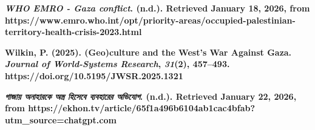 \textbf{\emph{WHO EMRO - Gaza conflict}. (n.d.). Retrieved January 18,
2026, from
https://www.emro.who.int/opt/priority-areas/occupied-palestinian-territory-health-crisis-2023.html}

\textbf{Wilkin, P. (2025). (Geo)culture and the West's War Against Gaza.
\emph{Journal of World-Systems Research}, \emph{31}(2), 457--493.
https://doi.org/10.5195/JWSR.2025.1321}

\textbf{\emph{গাজায় অনাহারকে অস্ত্র হিসেবে ব্যবহারের অভিযোগ}. (n.d.).
Retrieved January 22, 2026, from
https://ekhon.tv/article/65f1a496b6104ab1cac4bfab?utm\_source=chatgpt.com}

\textbf{~}
